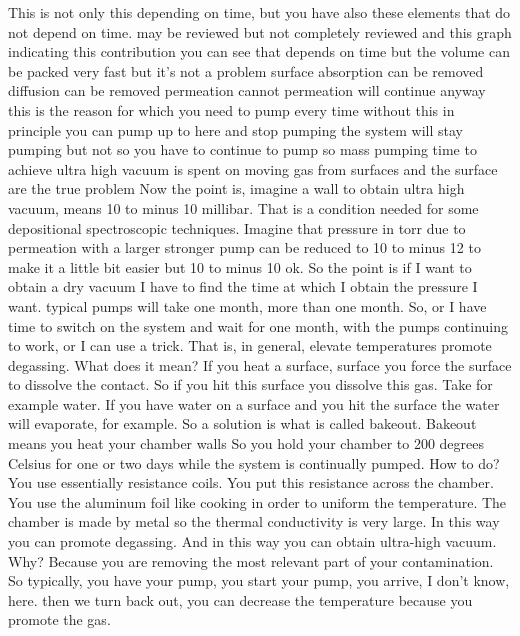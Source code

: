 This is not only this depending on time, but you have also these elements that do not depend on time. may be reviewed but not completely reviewed and this graph indicating this contribution you can see that depends on time but the volume can be packed very fast but it's not a problem surface absorption can be removed diffusion can be removed permeation cannot permeation will continue anyway this is the reason for which you need to pump every time without this in principle you can pump up to here and stop pumping the system will stay pumping but not so you have to continue to pump so mass pumping time to achieve ultra high vacuum is spent on moving gas from surfaces and the surface are the true problem Now the point is, imagine a wall to obtain ultra high vacuum, means 10 to minus 10 millibar. That is a condition needed for some depositional spectroscopic techniques. Imagine that pressure in torr due to permeation with a larger stronger pump can be reduced to 10 to minus 12 to make it a little bit easier but 10 to minus 10 ok. So the point is if I want to obtain a dry vacuum I have to find the time at which I obtain the pressure I want. typical pumps will take one month, more than one month. So, or I have time to switch on the system and wait for one month, with the pumps continuing to work, or I can use a trick. That is, in general, elevate temperatures promote degassing. What does it mean? If you heat a surface, surface you force the surface to dissolve the contact. So if you hit this surface you dissolve this gas. Take for example water. If you have water on a surface and you hit the surface the water will evaporate, for example. So a solution is what is called bakeout. Bakeout means you heat your chamber walls So you hold your chamber to 200 degrees Celsius for one or two days while the system is continually pumped. How to do? You use essentially resistance coils. You put this resistance across the chamber. You use the aluminum foil like cooking in order to uniform the temperature. The chamber is made by metal so the thermal conductivity is very large. In this way you can promote degassing. And in this way you can obtain ultra-high vacuum. Why? Because you are removing the most relevant part of your contamination. So typically, you have your pump, you start your pump, you arrive, I don't know, here. then we turn back out, you can decrease the temperature because you promote the gas.
